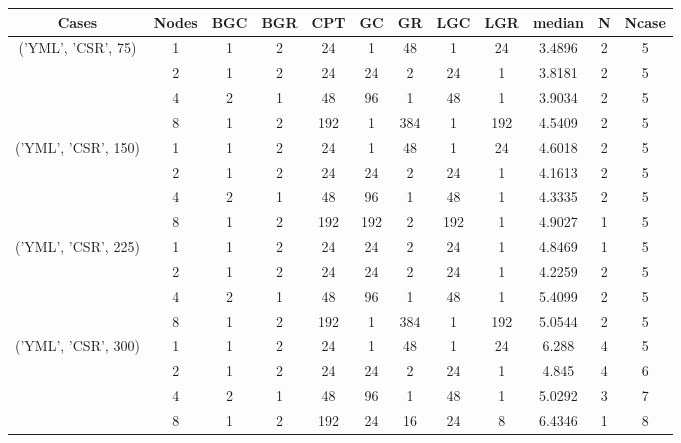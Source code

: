 \begin{tabular}{cccccccccccc}
\hline
Cases & Nodes& BGC& BGR& CPT& GC& GR& LGC& LGR& median & N & Ncase \\
\hline
\multirow{4}{*}{('YML', 'CSR', 75)}& 1& 1& 2& 24& 1& 48& 1& 24& 3.4896& 2& 5\\
& 2& 1& 2& 24& 24& 2& 24& 1& 3.8181& 2& 5\\
& 4& 2& 1& 48& 96& 1& 48& 1& 3.9034& 2& 5\\
& 8& 1& 2& 192& 1& 384& 1& 192& 4.5409& 2& 5\\
\hline
\multirow{4}{*}{('YML', 'CSR', 150)}& 1& 1& 2& 24& 1& 48& 1& 24& 4.6018& 2& 5\\
& 2& 1& 2& 24& 24& 2& 24& 1& 4.1613& 2& 5\\
& 4& 2& 1& 48& 96& 1& 48& 1& 4.3335& 2& 5\\
& 8& 1& 2& 192& 192& 2& 192& 1& 4.9027& 1& 5\\
\hline
\multirow{4}{*}{('YML', 'CSR', 225)}& 1& 1& 2& 24& 24& 2& 24& 1& 4.8469& 1& 5\\
& 2& 1& 2& 24& 24& 2& 24& 1& 4.2259& 2& 5\\
& 4& 2& 1& 48& 96& 1& 48& 1& 5.4099& 2& 5\\
& 8& 1& 2& 192& 1& 384& 1& 192& 5.0544& 2& 5\\
\hline
\multirow{4}{*}{('YML', 'CSR', 300)}& 1& 1& 2& 24& 1& 48& 1& 24& 6.288& 4& 5\\
& 2& 1& 2& 24& 24& 2& 24& 1& 4.845& 4& 6\\
& 4& 2& 1& 48& 96& 1& 48& 1& 5.0292& 3& 7\\
& 8& 1& 2& 192& 24& 16& 24& 8& 6.4346& 1& 8\\
\hline
\end{tabular}
